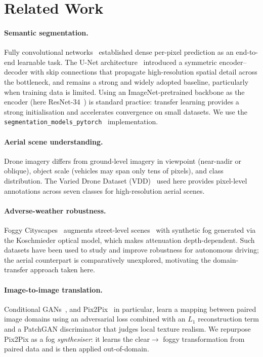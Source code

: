 \documentclass[11pt,a4paper]{article}
\begin{document}
\section{Related Work}

\paragraph{Semantic segmentation.}
Fully convolutional networks~\cite{long2015fcn} established dense per-pixel
prediction as an end-to-end learnable task. The U-Net
architecture~\cite{ronneberger2015unet} introduced a symmetric
encoder--decoder with skip connections that propagate high-resolution spatial
detail across the bottleneck, and remains a strong and widely adopted baseline,
particularly when training data is limited. Using an ImageNet-pretrained
backbone as the encoder (here ResNet-34~\cite{he2016resnet}) is standard
practice: transfer learning provides a strong initialisation and accelerates
convergence on small datasets. We use the
\texttt{segmentation\_models\_pytorch}~\cite{iakubovskii2019smp} implementation.

\paragraph{Aerial scene understanding.}
Drone imagery differs from ground-level imagery in viewpoint (near-nadir or
oblique), object scale (vehicles may span only tens of pixels), and class
distribution. The Varied Drone Dataset (VDD)~\cite{cai2023vdd} used here
provides pixel-level annotations across seven classes for high-resolution
aerial scenes.

\paragraph{Adverse-weather robustness.}
Foggy Cityscapes~\cite{sakaridis2018foggy} augments street-level
scenes~\cite{cordts2016cityscapes} with synthetic fog generated via
the Koschmieder optical model, which makes attenuation depth-dependent. Such
datasets have been used to study and improve robustness for autonomous driving;
the aerial counterpart is comparatively unexplored, motivating the
domain-transfer approach taken here.

\paragraph{Image-to-image translation.}
Conditional GANs~\cite{goodfellow2014gan,mirza2014cgan}, and
Pix2Pix~\cite{isola2017pix2pix} in particular, learn a mapping between paired
image domains using an adversarial loss combined with an $L_1$ reconstruction
term and a PatchGAN discriminator that judges local texture realism. We
repurpose Pix2Pix as a fog \emph{synthesiser}: it learns the clear$\rightarrow$
foggy transformation from paired data and is then applied out-of-domain.
\end{document}
